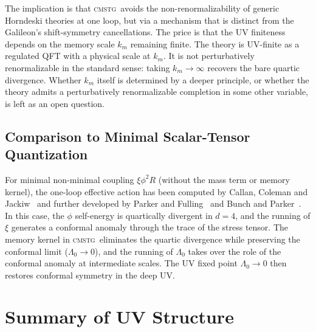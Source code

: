 \documentclass[12pt,a4paper]{article}
\newcommand{\CMSTG}{\textsc{cmstg}}
\newcommand{\Lz}{{\Lambda_0}}
\newcommand{\km}{{k_m}}
\begin{document}
The implication is that \CMSTG\ avoids the non-renormalizability of generic
Horndeski theories at one loop, but via a mechanism that is distinct from
the Galileon's shift-symmetry cancellations. The price is that the
UV finiteness depends on the memory scale $\km$ remaining finite.
The theory is UV-finite as a regulated QFT with a physical scale at $\km$.
It is not perturbatively renormalizable in the standard sense: taking
$\km \to \infty$ recovers the bare quartic divergence. Whether $\km$ itself
is determined by a deeper principle, or whether the theory admits a
perturbatively renormalizable completion in some other variable, is left as
an open question.

\subsection{Comparison to Minimal Scalar-Tensor Quantization}

For minimal non-minimal coupling $\xi\phi^2 R$ (without the mass term or
memory kernel), the one-loop effective action has been computed by
Callan, Coleman and Jackiw~\cite{Callan1970} and further developed
by Parker and Fulling~\cite{Parker1974} and Bunch and Parker~\cite{Bunch1979}.
In this case, the $\phi$ self-energy is quartically divergent in $d=4$, and
the running of $\xi$ generates a conformal anomaly through the trace of
the stress tensor. The memory kernel in \CMSTG\ eliminates the quartic
divergence while preserving the conformal limit ($\Lz \to 0$), and the
running of $\Lz$ takes over the role of the conformal anomaly at
intermediate scales. The UV fixed point $\Lz \to 0$ then restores
conformal symmetry in the deep UV.

\section{Summary of UV Structure}
\label{sec:summary}
\end{document}
